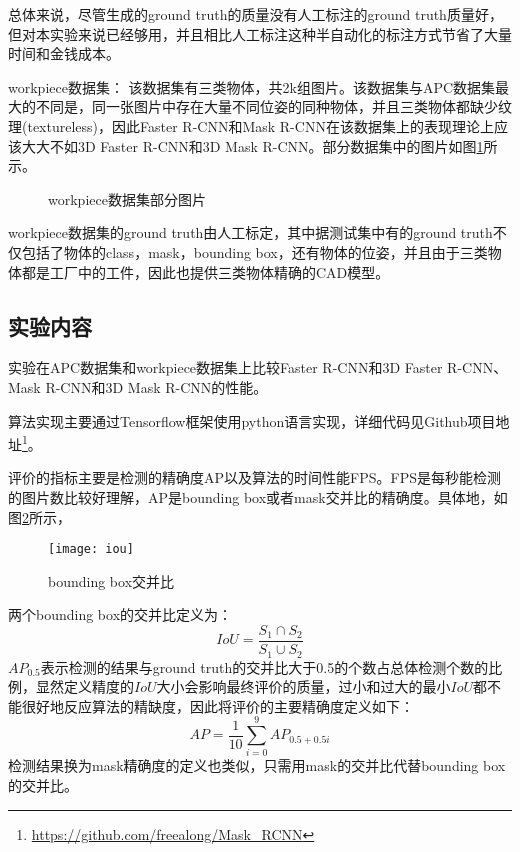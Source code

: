 总体来说，尽管生成的ground truth的质量没有人工标注的ground truth质量好，但对本实验来说已经够用，并且相比人工标注这种半自动化的标注方式节省了大量时间和金钱成本。

{\kai workpiece数据集：} 该数据集有三类物体，共2k组图片。该数据集与APC数据集最大的不同是，同一张图片中存在大量不同位姿的同种物体，并且三类物体都缺少纹理(textureless)，因此Faster R-CNN和Mask R-CNN在该数据集上的表现理论上应该大大不如3D Faster R-CNN和3D Mask R-CNN。部分数据集中的图片如图\ref{fig:wp_dataset}所示。
\begin{figure}[ht]
  \centering
  \hskip0.2cm
  \hskip0.2cm
  \vfill
  \hskip0.2cm
  \hskip0.2cm
  \caption{workpiece数据集部分图片}
  \label{fig:wp_dataset}
\end{figure}
workpiece数据集的ground truth由人工标定，其中据测试集中有的ground truth不仅包括了物体的class，mask，bounding box，还有物体的位姿，并且由于三类物体都是工厂中的工件，因此也提供三类物体精确的CAD模型。

\subsection{实验内容}
实验在APC数据集和workpiece数据集上比较Faster R-CNN和3D Faster R-CNN、Mask R-CNN和3D Mask R-CNN的性能。

{\kai 算法实现}主要通过Tensorflow框架使用python语言实现，详细代码见Github项目地址\footnote{\url{https://github.com/freealong/Mask\_RCNN}}。

{\kai 评价的指标}主要是检测的精确度AP以及算法的时间性能FPS。FPS是每秒能检测的图片数比较好理解，AP是bounding box或者mask交并比的精确度。具体地，如图\ref{fig:iou}所示，
\begin{figure}[ht]
  \centering
  \texttt{[image: iou]}
  \caption{bounding box交并比}
  \label{fig:iou}
\end{figure}
两个bounding box的交并比定义为：
\begin{equation}
  IoU = \frac{S_1\cap S_2}{S_1\cup S_2}
\end{equation}
$AP_{0.5}$表示检测的结果与ground truth的交并比大于0.5的个数占总体检测个数的比例，显然定义精度的$IoU$大小会影响最终评价的质量，过小和过大的最小$IoU$都不能很好地反应算法的精缺度，因此将评价的主要精确度定义如下：
\begin{equation}
  AP = \frac{1}{10}\sum_{i=0}^{9}{AP_{0.5 + 0.5i}}
\end{equation}
检测结果换为mask精确度的定义也类似，只需用mask的交并比代替bounding box的交并比。

